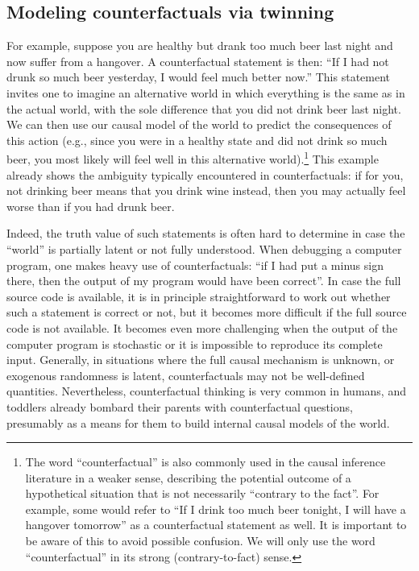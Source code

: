 
\subsection{Modeling counterfactuals via twinning}

For example, suppose you are healthy but drank too much beer last night and now suffer from a hangover. 
A counterfactual statement is then: ``If I had not drunk so much beer yesterday, I would feel much better now.''
This statement invites one to imagine an alternative world in which everything is the same as in the actual world,
with the sole difference that you did not drink beer last night. We can then use our causal model of the world to predict the
consequences of this action (e.g., since you were in a healthy state and did not drink so much beer, you most likely will
feel well in this alternative world).\footnote{The word ``counterfactual'' is also commonly used in the causal inference literature in a weaker sense, describing the potential outcome of a hypothetical situation that is not necessarily ``contrary to the fact''. For example, some would refer to ``If I drink too much beer tonight, I will have a hangover tomorrow'' as a counterfactual statement as well.
It is important to be aware of this to avoid possible confusion. We will only use the word ``counterfactual'' in its strong (contrary-to-fact) sense.}
This example already shows the ambiguity typically encountered in counterfactuals: if for you, not drinking beer means
that you drink wine instead, then you may actually feel worse than if you had drunk beer.

Indeed, the truth value of such statements is often hard to determine in case the ``world'' is partially latent or not
fully understood. When debugging a computer program, one makes heavy use of counterfactuals: ``if I had put a minus sign
there, then the output of my program would have been correct''. In case the full source code is available, it is in 
principle straightforward to work out whether such a statement is correct or not, but it becomes more difficult if 
the full source code is not available. It becomes even more challenging when the output of the computer program is
stochastic or it is impossible to reproduce its complete input. 
Generally, in situations where the full causal mechanism is unknown, or exogenous
randomness is latent, counterfactuals may not be well-defined quantities. Nevertheless, counterfactual thinking is 
very common in humans, and toddlers already bombard their parents with counterfactual questions, 
presumably as a means for them to build internal causal models of the world.

